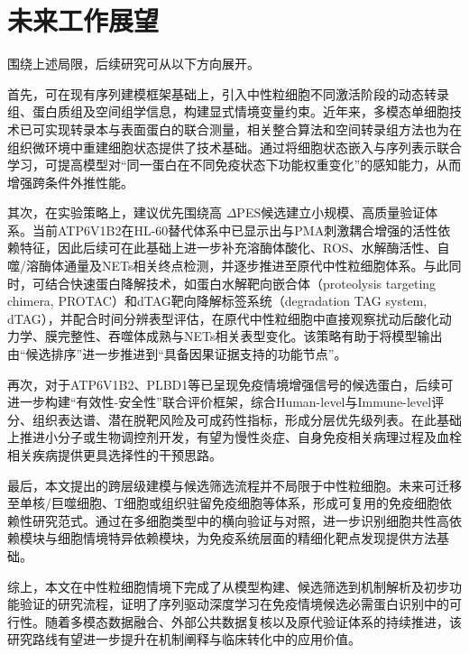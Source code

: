 \section{未来工作展望}

围绕上述局限，后续研究可从以下方向展开。

首先，可在现有序列建模框架基础上，引入中性粒细胞不同激活阶段的动态转录组、蛋白质组及空间组学信息，构建显式情境变量约束。近年来，多模态单细胞技术已可实现转录本与表面蛋白的联合测量，相关整合算法和空间转录组方法也为在组织微环境中重建细胞状态提供了技术基础\cite{stoeckius2017cite,hao2021multimodal,stahl2016spatial}。通过将细胞状态嵌入与序列表示联合学习，可提高模型对“同一蛋白在不同免疫状态下功能权重变化”的感知能力，从而增强跨条件外推性能。

其次，在实验策略上，建议优先围绕高 $\Delta$PES候选建立小规模、高质量验证体系。当前ATP6V1B2在HL-60替代体系中已显示出与PMA刺激耦合增强的活性依赖特征，因此后续可在此基础上进一步补充溶酶体酸化、ROS、水解酶活性、自噬/溶酶体通量及NETs相关终点检测，并逐步推进至原代中性粒细胞体系。与此同时，可结合快速蛋白降解技术，如蛋白水解靶向嵌合体（proteolysis targeting chimera, PROTAC）和dTAG靶向降解标签系统（degradation TAG system, dTAG）\cite{buckley2015haloprotacs,nabet2018dtag}，并配合时间分辨表型评估，在原代中性粒细胞中直接观察扰动后酸化动力学、膜完整性、吞噬体成熟与NETs相关表型变化。该策略有助于将模型输出由“候选排序”进一步推进到“具备因果证据支持的功能节点”。

再次，对于ATP6V1B2、PLBD1等已呈现免疫情境增强信号的候选蛋白，后续可进一步构建“有效性-安全性”联合评价框架，综合Human-level与Immune-level评分、组织表达谱、潜在脱靶风险及可成药性指标，形成分层优先级列表。在此基础上推进小分子或生物调控剂开发，有望为慢性炎症、自身免疫相关病理过程及血栓相关疾病提供更具选择性的干预思路。

最后，本文提出的跨层级建模与候选筛选流程并不局限于中性粒细胞。未来可迁移至单核/巨噬细胞、T细胞或组织驻留免疫细胞等体系，形成可复用的免疫细胞依赖性研究范式。通过在多细胞类型中的横向验证与对照，进一步识别细胞共性高依赖模块与细胞情境特异依赖模块，为免疫系统层面的精细化靶点发现提供方法基础。

综上，本文在中性粒细胞情境下完成了从模型构建、候选筛选到机制解析及初步功能验证的研究流程，证明了序列驱动深度学习在免疫情境候选必需蛋白识别中的可行性。随着多模态数据融合、外部公共数据复核以及原代验证体系的持续推进，该研究路线有望进一步提升在机制阐释与临床转化中的应用价值。

